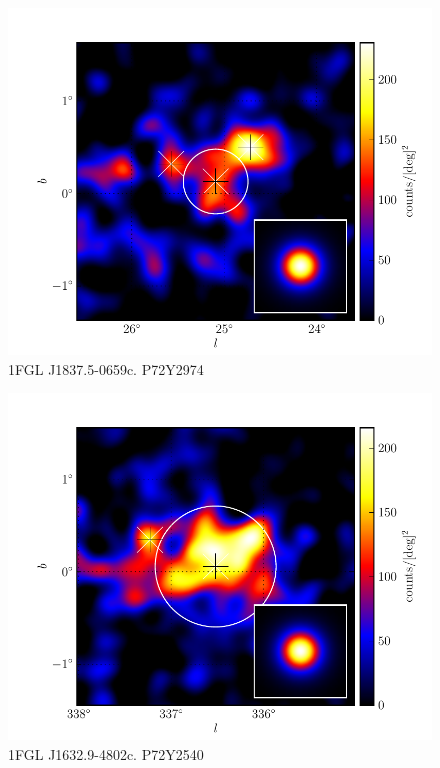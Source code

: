 \documentclass[preprint]{aastex}
\begin{document}
\begin{figure}
  \begin{center}
    \includegraphics[type=pdf,ext=.pdf,read=.pdf]{source_plots/source_1FGL_J1837.5-0659c}
  \end{center}
  \caption{1FGL J1837.5-0659c. P72Y2974
  }\label{1FGL_J1837.5-0659c}
\end{figure}


\begin{figure}
  \begin{center}
    \includegraphics[type=pdf,ext=.pdf,read=.pdf]{source_plots/source_1FGL_J1632.9-4802c}
  \end{center}
  \caption{1FGL J1632.9-4802c. P72Y2540
  }\label{1FGL_J1632.9-4802c}
\end{figure}
\end{document}
